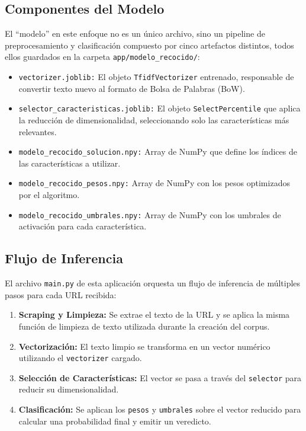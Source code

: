 \subsection{Componentes del Modelo}
El ``modelo'' en este enfoque no es un único archivo, sino un pipeline de preprocesamiento y clasificación compuesto por cinco artefactos distintos, todos ellos guardados en la carpeta \texttt{app/modelo\_recocido/}:
\begin{itemize}
    \item \texttt{vectorizer.joblib:} El objeto \texttt{TfidfVectorizer} entrenado, responsable de convertir texto nuevo al formato de Bolsa de Palabras (BoW).
    \item \texttt{selector\_caracteristicas.joblib:} El objeto \texttt{SelectPercentile} que aplica la reducción de dimensionalidad, seleccionando solo las características más relevantes.
    \item \texttt{modelo\_recocido\_solucion.npy:} Array de NumPy que define los índices de las características a utilizar.
    \item \texttt{modelo\_recocido\_pesos.npy:} Array de NumPy con los pesos optimizados por el algoritmo.
    \item \texttt{modelo\_recocido\_umbrales.npy:} Array de NumPy con los umbrales de activación para cada característica.
\end{itemize}

\subsection{Flujo de Inferencia}
El archivo \texttt{main.py} de esta aplicación orquesta un flujo de inferencia de múltiples pasos para cada URL recibida:
\begin{enumerate}
    \item \textbf{Scraping y Limpieza:} Se extrae el texto de la URL y se aplica la misma función de limpieza de texto utilizada durante la creación del corpus.
    \item \textbf{Vectorización:} El texto limpio se transforma en un vector numérico utilizando el \texttt{vectorizer} cargado.
    \item \textbf{Selección de Características:} El vector se pasa a través del \texttt{selector} para reducir su dimensionalidad.
    \item \textbf{Clasificación:} Se aplican los \texttt{pesos} y \texttt{umbrales} sobre el vector reducido para calcular una probabilidad final y emitir un veredicto.
\end{enumerate}

